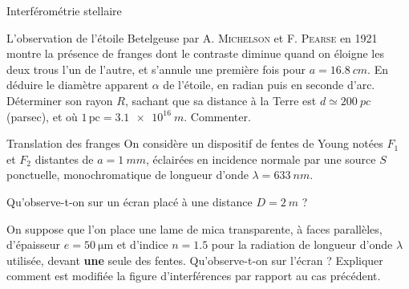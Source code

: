\begin{exo}[PC][3][TD]{Interférométrie stellaire}
\begin{quest}
L'observation de l’étoile Betelgeuse par A. \textsc{Michelson} et F. \textsc{Pearse} en 1921 montre la présence de franges dont le contraste diminue quand on éloigne les deux trous l'un de l'autre, et s'annule une première fois pour $a=\SI{16.8}{cm}$. En déduire le diamètre apparent $\alpha$ de l'étoile, en radian puis en seconde d'arc. Déterminer son rayon $R$, sachant que sa distance à la Terre est $d\simeq\SI{200}{pc}$ (parsec), et où $1\,\text{pc}=\SI{3.1e16}{m}$. Commenter.
\end{quest}
\end{exo}

\begin{exo}[PC]{Translation des franges}
On considère un dispositif de fentes de Young notées $F_1$ et $F_2$ distantes de $a=\SI{1}{mm}$, éclairées en incidence normale par une source $S$ ponctuelle, monochromatique de longueur d'onde $\lambda=\SI{633}{nm}$.

\begin{quest}
\item Qu'observe-t-on sur un écran placé à une distance $D=\SI{2}{m}$ ?
\item On suppose que l'on place une lame de mica transparente, à faces parallèles, d'épaisseur $e=\SI{50}{\micro\meter}$ et d'indice $n=1.5$ pour la radiation de longueur d'onde $\lambda$ utilisée, devant \textbf{une} seule des fentes. Qu'observe-t-on sur l'écran ? Expliquer comment est modifiée la figure d'interférences par rapport au cas précédent.
\end{quest}
\end{exo}

